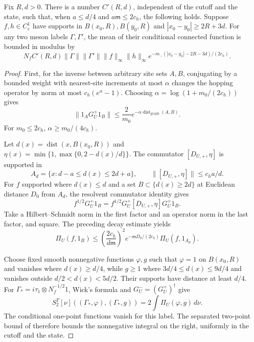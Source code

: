 \documentclass[11pt,letterpaper,reqno]{amsart}
\makeatletter
\theoremstyle{definition}
\newcommand{\ms@minorstart}{%
  \pushQED{\qed}\renewcommand{\qedsymbol}{$\blacksquare$}}
\newenvironment{lemma}[1][]{\ms@minorstart\ms@lemma[#1]}
  {\popQED\endms@lemma}
\theoremstyle{remark}
\makeatother
\begin{document}
\begin{lemma}[A uniform estimate for one quark loop]
\label{C-401-42}
Fix $R,d>0$. There is a number $C'(R,d)$, independent
of the cutoff and the state, such that, when
$a\le d/4$ and $a\mathsf m\le2c_h$, the following
holds. Suppose $f,h\in C_c^1$ have supports in
$B(x_0,R),B(y_0,R)$ and $|x_0-y_0|\ge2R+3d$.
For any two meson labels $\Gamma,\Gamma'$,
the mean of their conditional connected function
is bounded in modulus by
\begin{equation}\label{eq:qcd2-quark-loop-decay}
 N_fC'(R,d)\|\Gamma\|\|\Gamma'\|
 \|f\|_\infty\|h\|_\infty
       e^{-m_-(|x_0-y_0|-2R-3d)/(2c_h)}.
\end{equation}
\end{lemma}

\begin{proof}
First, for the inverse between arbitrary site sets
$A,B$, conjugating by a bounded weight with nearest-site
increments at most $\alpha$ changes the hopping operator
by norm at most $c_h(e^\alpha-1)$. Choosing
$\alpha=\log(1+m_0/(2c_h))$ gives
\[
 \|1_AG_U^+1_B\|\le\frac2{m_0}
                   e^{-\alpha\operatorname{dist}_{\mathrm{graph}}(A,B)}.
\]
For $m_0\le2c_h$, $\alpha\ge m_0/(4c_h)$.

Let $d(x)=\operatorname{dist}(x,B(x_0,R))$ and
$\eta(x)=\min\{1,\max\{0,2-d(x)/d\}\}$.
The commutator $[D_{U,+},\eta]$ is supported in
\[
 A_d=\{x:d-a\le d(x)\le2d+a\},
 \qquad\|[D_{U,+},\eta]\|\le c_ha/d.
\]
For $f$ supported where $d(x)\le d$ and a set
$B\subset\{d(x)\ge2d\}$ at Euclidean distance
$D_0$ from $A_d$, the resolvent commutator identity
gives
\[
 f^{1/2}G_U^+1_B
    =f^{1/2}G_U^+[D_{U,+},\eta]G_U^+1_B.
\]
Take a Hilbert--Schmidt norm in the first factor and
an operator norm in the last factor, and square.
The preceding decay estimate yields
\begin{equation}\label{eq:qcd2-annulus}
 \Pi_U(f,1_B)
 \le\left(\frac{2c_h}{d\mathsf m}\right)^2
       e^{-\mathsf mD_0/(2c_h)}\Pi_U(f,1_{A_d}).
\end{equation}

Choose fixed smooth nonnegative functions $\varphi,g$
such that $\varphi=1$ on $B(x_0,R)$ and vanishes
where $d(x)\ge d/4$, while $g\ge1$ where
$3d/4\le d(x)\le9d/4$ and vanishes outside
$d/2<d(x)<5d/2$. Their supports have distance at
least $d/4$. For
$\Gamma_*=i\tau_1\otimes N_f^{-1/2}1$, Wick's
formula and $G_U^-= (G_U^+)^\dagger$ give
\[
 S_2^T[\nu]((\Gamma_*,\varphi),(\Gamma_*,g))
                         =2\int\Pi_U(\varphi,g)\,d\nu.
\]
The conditional one-point functions vanish for this
label. The separated two-point bound of \cite{QCDM1}
therefore bounds the nonnegative integral on the
right, uniformly in the cutoff and the state.


\end{proof}
\end{document}
